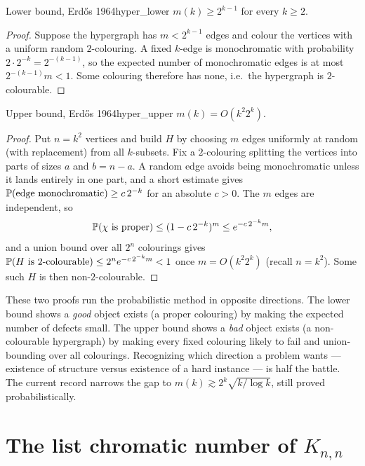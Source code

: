 \begin{theorem}{Lower bound, Erd\H{o}s 1964}{hyper_lower}
$m(k)\ge 2^{k-1}$ for every $k\ge2$.
\end{theorem}

\begin{proof}
Suppose the hypergraph has $m<2^{k-1}$ edges and colour the vertices with a
uniform random $2$-colouring. A fixed $k$-edge is monochromatic with
probability $2\cdot 2^{-k}=2^{-(k-1)}$, so the expected number of monochromatic
edges is at most $2^{-(k-1)}m<1$. Some colouring therefore has none, i.e.\ the
hypergraph is $2$-colourable.
\end{proof}

\begin{theorem}{Upper bound, Erd\H{o}s 1964}{hyper_upper}
$m(k)=O(k^2 2^k)$.
\end{theorem}

\begin{proof}
Put $n=k^2$ vertices and build $H$ by choosing $m$ edges uniformly at random
(with replacement) from all $k$-subsets. Fix a $2$-colouring splitting the
vertices into parts of sizes $a$ and $b=n-a$. A random edge avoids being
monochromatic unless it lands entirely in one part, and a short estimate gives
$\mathbb{P}(\text{edge monochromatic})\ge c\,2^{-k}$ for an absolute $c>0$. The $m$
edges are independent, so
\[
  \mathbb{P}(\chi\text{ is proper})\le(1-c\,2^{-k})^m\le e^{-c\,2^{-k}m},
\]
and a union bound over all $2^n$ colourings gives
$\mathbb{P}(H\text{ is }2\text{-colourable})\le 2^n e^{-c\,2^{-k}m}<1$ once
$m=O(k^2 2^k)$ (recall $n=k^2$). Some such $H$ is then non-$2$-colourable.
\end{proof}

\begin{insight}
These two proofs run the probabilistic method in opposite directions. The lower
bound shows a \emph{good} object exists (a proper colouring) by making the
expected number of defects small. The upper bound shows a \emph{bad} object
exists (a non-colourable hypergraph) by making every fixed colouring likely to
fail and union-bounding over all colourings. Recognizing which direction a
problem wants --- existence of structure versus existence of a hard instance ---
is half the battle. The current record narrows the gap to
$m(k)\gtrsim 2^k\sqrt{k/\log k}$, still proved probabilistically.
\end{insight}

\section{The list chromatic number of \texorpdfstring{$K_{n,n}$}{Knn}}

